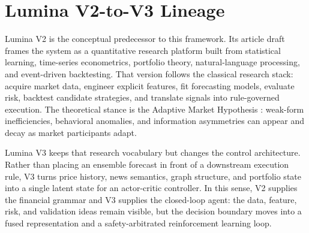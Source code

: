\documentclass[10pt]{article}
\begin{document}
\section{Lumina V2-to-V3 Lineage}

Lumina V2 is the conceptual predecessor to this framework. Its article draft frames the system
as a quantitative research platform built from statistical learning, time-series
econometrics, portfolio theory, natural-language processing, and event-driven backtesting.
That version follows the classical research stack: acquire market data, engineer explicit
features, fit forecasting models, evaluate risk, backtest candidate strategies, and translate
signals into rule-governed execution. The theoretical stance is the Adaptive Market
Hypothesis \cite{lo2004}: weak-form inefficiencies, behavioral anomalies, and information
asymmetries can appear and decay as market participants adapt.

Lumina V3 keeps that research vocabulary but changes the control architecture. Rather than
placing an ensemble forecast in front of a downstream execution rule, V3 turns price history,
news semantics, graph structure, and portfolio state into a single latent state for an
actor-critic controller. In this sense, V2 supplies the financial grammar and V3 supplies the
closed-loop agent: the data, feature, risk, and validation ideas remain visible, but the
decision boundary moves into a fused representation and a safety-arbitrated reinforcement
learning loop.
\end{document}
